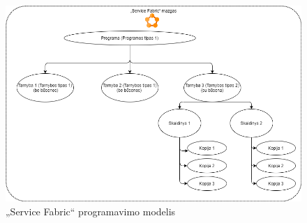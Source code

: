 \begin{figure}[htp!]
\centering
\includegraphics[scale=0.4]{img/SF_programming_model.png}
\caption{„Service Fabric“ programavimo modelis \cite{ServiceFabricTerminology}}
\label{fig:sf_programming_model}
\end{figure}